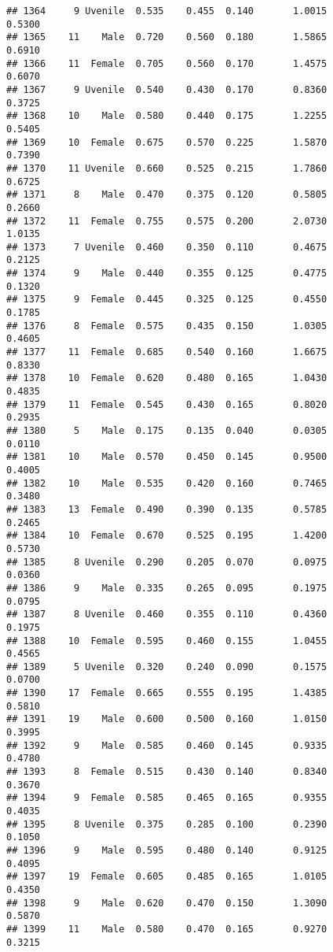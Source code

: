 \documentclass[
]{article}
\begin{document}
\begin{verbatim}
## 1364     9 Uvenile  0.535    0.455  0.140       1.0015         0.5300
## 1365    11    Male  0.720    0.560  0.180       1.5865         0.6910
## 1366    11  Female  0.705    0.560  0.170       1.4575         0.6070
## 1367     9 Uvenile  0.540    0.430  0.170       0.8360         0.3725
## 1368    10    Male  0.580    0.440  0.175       1.2255         0.5405
## 1369    10  Female  0.675    0.570  0.225       1.5870         0.7390
## 1370    11 Uvenile  0.660    0.525  0.215       1.7860         0.6725
## 1371     8    Male  0.470    0.375  0.120       0.5805         0.2660
## 1372    11  Female  0.755    0.575  0.200       2.0730         1.0135
## 1373     7 Uvenile  0.460    0.350  0.110       0.4675         0.2125
## 1374     9    Male  0.440    0.355  0.125       0.4775         0.1320
## 1375     9  Female  0.445    0.325  0.125       0.4550         0.1785
## 1376     8  Female  0.575    0.435  0.150       1.0305         0.4605
## 1377    11  Female  0.685    0.540  0.160       1.6675         0.8330
## 1378    10  Female  0.620    0.480  0.165       1.0430         0.4835
## 1379    11  Female  0.545    0.430  0.165       0.8020         0.2935
## 1380     5    Male  0.175    0.135  0.040       0.0305         0.0110
## 1381    10    Male  0.570    0.450  0.145       0.9500         0.4005
## 1382    10    Male  0.535    0.420  0.160       0.7465         0.3480
## 1383    13  Female  0.490    0.390  0.135       0.5785         0.2465
## 1384    10  Female  0.670    0.525  0.195       1.4200         0.5730
## 1385     8 Uvenile  0.290    0.205  0.070       0.0975         0.0360
## 1386     9    Male  0.335    0.265  0.095       0.1975         0.0795
## 1387     8 Uvenile  0.460    0.355  0.110       0.4360         0.1975
## 1388    10  Female  0.595    0.460  0.155       1.0455         0.4565
## 1389     5 Uvenile  0.320    0.240  0.090       0.1575         0.0700
## 1390    17  Female  0.665    0.555  0.195       1.4385         0.5810
## 1391    19    Male  0.600    0.500  0.160       1.0150         0.3995
## 1392     9    Male  0.585    0.460  0.145       0.9335         0.4780
## 1393     8  Female  0.515    0.430  0.140       0.8340         0.3670
## 1394     9  Female  0.585    0.465  0.165       0.9355         0.4035
## 1395     8 Uvenile  0.375    0.285  0.100       0.2390         0.1050
## 1396     9    Male  0.595    0.480  0.140       0.9125         0.4095
## 1397    19  Female  0.605    0.485  0.165       1.0105         0.4350
## 1398     9    Male  0.620    0.470  0.150       1.3090         0.5870
## 1399    11    Male  0.580    0.470  0.165       0.9270         0.3215

\end{verbatim}
\end{document}
